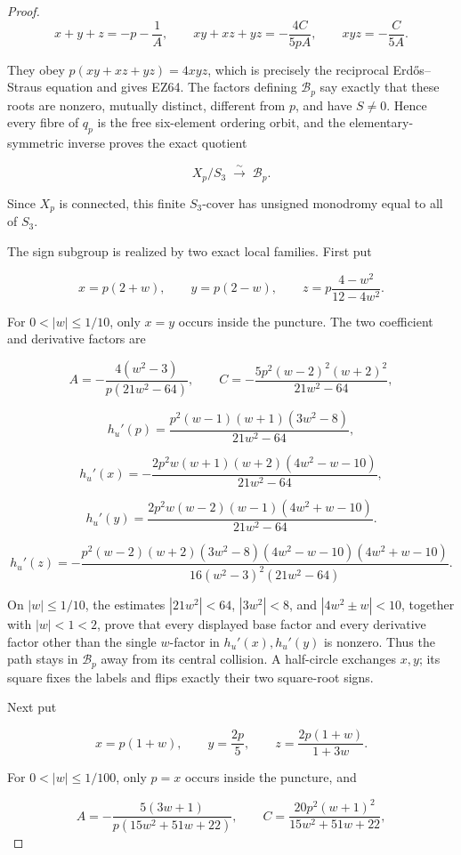 \begin{proof}
\[
 x+y+z=-p-\frac1A,\qquad
 xy+xz+yz=-\frac{4C}{5pA},\qquad
 xyz=-\frac{C}{5A}.
\]

They obey \(p(xy+xz+yz)=4xyz\), which is precisely the reciprocal
Erd\H{o}s--Straus equation and gives EZ64.  The factors defining
\(\mathcal B_p\) say exactly that these roots are nonzero, mutually distinct,
different from \(p\), and have \(S\ne0\).  Hence every fibre of \(q_p\) is
the free six-element ordering orbit, and the elementary-symmetric inverse
proves the exact quotient

\[
 X_p/S_3\;\xrightarrow{\ \sim\ }\;\mathcal B_p.
\]

Since \(X_p\) is connected, this finite \(S_3\)-cover has unsigned monodromy
equal to all of \(S_3\).

The sign subgroup is realized by two exact local families.  First put

\[
 x=p(2+w),\qquad y=p(2-w),\qquad
 z=p\frac{4-w^2}{12-4w^2}.
\]

For \(0<|w|\le1/10\), only \(x=y\) occurs inside the puncture.  The two
coefficient and derivative factors are

\[
 A=-\frac{4(w^2-3)}{p(21w^2-64)},\qquad
 C=-\frac{5p^2(w-2)^2(w+2)^2}{21w^2-64},
\]

\[
 h_u'(p)=
 \frac{p^2(w-1)(w+1)(3w^2-8)}{21w^2-64},
\]

\[
 h_u'(x)=
 -\frac{2p^2w(w+1)(w+2)(4w^2-w-10)}{21w^2-64},
\]

\[
 h_u'(y)=
 \frac{2p^2w(w-2)(w-1)(4w^2+w-10)}{21w^2-64}.
\]

\[
 h_u'(z)=
 -\frac{p^2(w-2)(w+2)(3w^2-8)
 (4w^2-w-10)(4w^2+w-10)}
 {16(w^2-3)^2(21w^2-64)}.
\]

On \(|w|\le1/10\), the estimates
\(|21w^2|<64\), \(|3w^2|<8\), and
\(|4w^2\mathbin{\pm}w|<10\), together with
\(|w|<1<2\), prove that every displayed base factor and every derivative
factor other than the single \(w\)-factor in \(h_u'(x),h_u'(y)\) is nonzero.
Thus the path stays in \(\mathcal B_p\) away from its central collision.  A
half-circle exchanges \(x,y\); its square fixes the labels and flips exactly
their two square-root signs.

Next put

\[
 x=p(1+w),\qquad y=\frac{2p}{5},\qquad
 z=\frac{2p(1+w)}{1+3w}.
\]

For \(0<|w|\le1/100\), only \(p=x\) occurs inside the puncture, and

\[
 A=-\frac{5(3w+1)}{p(15w^2+51w+22)},\qquad
 C=\frac{20p^2(w+1)^2}{15w^2+51w+22},
\]


\end{proof}
